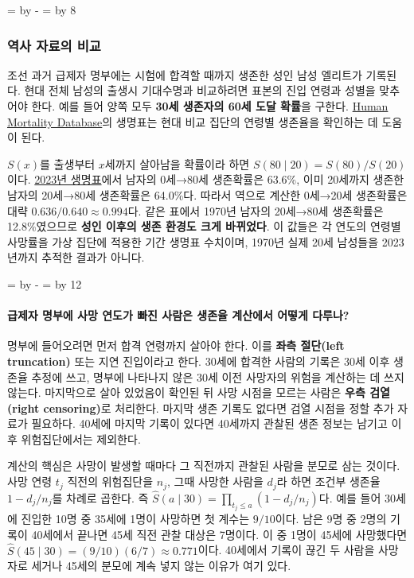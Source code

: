 \documentclass[10pt,a4paper]{article}
\newcommand{\ReserveQuestionSpace}{%
  \par\begingroup
  \dimen0=\pagegoal \advance\dimen0 by -\pagetotal
  \dimen2=\baselineskip \multiply\dimen2 by 12
  \ifdim\dimen0<\dimen2 \newpage\fi
  \endgroup}
\newcommand{\ReserveReadingSectionSpace}{%
  \par\begingroup
  \dimen0=\pagegoal \advance\dimen0 by -\pagetotal
  \dimen2=\baselineskip \multiply\dimen2 by 8
  \ifdim\dimen0<\dimen2 \newpage\fi
  \endgroup}
\begin{document}
\ReserveReadingSectionSpace
\subsubsection*{역사 자료의 비교}

조선 과거 급제자 명부에는 시험에 합격할 때까지 생존한 성인 남성 엘리트가 기록된다. 현대 전체 남성의 출생시 기대수명과 비교하려면 표본의 진입 연령과 성별을 맞추어야 한다. 예를 들어 양쪽 모두 \textbf{30세 생존자의 60세 도달 확률}을 구한다. \href{https://www.mortality.org/}{Human Mortality Database}의 생명표는 현대 비교 집단의 연령별 생존율을 확인하는 데 도움이 된다.\par

$S(x)$를 출생부터 $x$세까지 살아남을 확률이라 하면 $S(80\mid20)=S(80)/S(20)$이다. \href{https://mods.go.kr/boardDownload.es?bid=208\&list\_no=434042\&seq=3}{2023년 생명표}에서 남자의 0세→80세 생존확률은 63.6\%, 이미 20세까지 생존한 남자의 20세→80세 생존확률은 64.0\%다. 따라서 역으로 계산한 0세→20세 생존확률은 대략 $0.636/0.640\approx0.994$다. 같은 표에서 1970년 남자의 20세→80세 생존확률은 12.8\%였으므로 \textbf{성인 이후의 생존 환경도 크게 바뀌었다}. 이 값들은 각 연도의 연령별 사망률을 가상 집단에 적용한 기간 생명표 수치이며, 1970년 실제 20세 남성들을 2023년까지 추적한 결과가 아니다.\par

\ReserveQuestionSpace
\paragraph{급제자 명부에 사망 연도가 빠진 사람은 생존율 계산에서 어떻게 다루나?}
명부에 들어오려면 먼저 합격 연령까지 살아야 한다. 이를 \textbf{좌측 절단(left truncation)} 또는 지연 진입이라고 한다. 30세에 합격한 사람의 기록은 30세 이후 생존율 추정에 쓰고, 명부에 나타나지 않은 30세 이전 사망자의 위험을 계산하는 데 쓰지 않는다. 마지막으로 살아 있었음이 확인된 뒤 사망 시점을 모르는 사람은 \textbf{우측 검열(right censoring)}로 처리한다. 마지막 생존 기록도 없다면 검열 시점을 정할 추가 자료가 필요하다. 40세에 마지막 기록이 있다면 40세까지 관찰된 생존 정보는 남기고 이후 위험집단에서는 제외한다.\par

계산의 핵심은 사망이 발생할 때마다 그 직전까지 관찰된 사람을 분모로 삼는 것이다. 사망 연령 $t_j$ 직전의 위험집단을 $n_j$, 그때 사망한 사람을 $d_j$라 하면 조건부 생존율 $1-d_j/n_j$를 차례로 곱한다. 즉 $\widehat S(a\mid30)=\prod_{t_j\leq a}(1-d_j/n_j)$다. 예를 들어 30세에 진입한 10명 중 35세에 1명이 사망하면 첫 계수는 $9/10$이다. 남은 9명 중 2명의 기록이 40세에서 끝나면 45세 직전 관찰 대상은 7명이다. 이 중 1명이 45세에 사망했다면 $\widehat S(45\mid30)=(9/10)(6/7)\approx0.771$이다. 40세에서 기록이 끊긴 두 사람을 사망자로 세거나 45세의 분모에 계속 넣지 않는 이유가 여기 있다.\par
\end{document}
